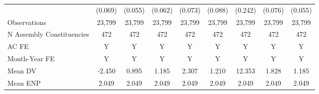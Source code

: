 {\begin{tabular}{l*{8}{c}}
            &     (0.069)         &     (0.055)         &     (0.062)         &     (0.073)         &     (0.088)         &     (0.242)         &     (0.076)         &     (0.055)         \\
Observations&      23,799         &      23,799         &      23,799         &      23,799         &      23,799         &      23,799         &      23,799         &      23,799         \\
N Assembly Constituencies&         472         &         472         &         472         &         472         &         472         &         472         &         472         &         472         \\
AC FE       &           Y         &           Y         &           Y         &           Y         &           Y         &           Y         &           Y         &           Y         \\
Month-Year FE&           Y         &           Y         &           Y         &           Y         &           Y         &           Y         &           Y         &           Y         \\
Mean DV     &      -2.450         &       0.895         &       1.185         &       2.307         &       1.210         &      12.353         &       1.828         &       1.185         \\
Mean ENP    &       2.049         &       2.049         &       2.049         &       2.049         &       2.049         &       2.049         &       2.049         &       2.049         \\
\bottomrule
\end{tabular}
}
